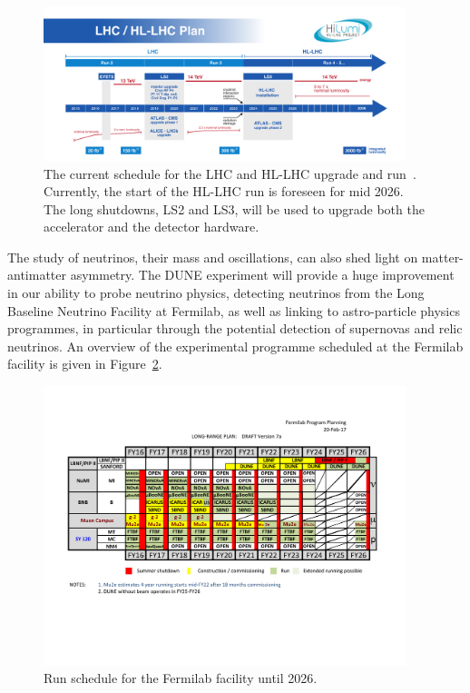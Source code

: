 \documentclass[twocolumn]{svjour3}          %
\begin{document}
\begin{figure}[bthp]
    \centering
    \includegraphics[width=0.94\textwidth]{HL-LHC-plan-2017-Plan-2.pdf}
    \caption{The current schedule for the LHC and HL-LHC upgrade
and run~\cite{HL-LHC}. Currently, the start of the HL-LHC run is foreseen for mid
2026. The long shutdowns, LS2 and LS3, will be used to upgrade both the
accelerator and the detector hardware.}
    \label{fig:hl-lhc}
\end{figure}

The study of neutrinos, their mass and oscillations, can also shed light
on matter-antimatter asymmetry. The DUNE experiment will provide a huge
improvement in our ability to probe neutrino physics, detecting
neutrinos from the Long Baseline Neutrino Facility at Fermilab, as well
as linking to astro-particle physics programmes, in particular through
the potential detection of supernovas and relic neutrinos. An overview
of the experimental programme scheduled at the Fermilab facility is
given in Figure~\ref{fig:fnal-if}.

\begin{figure}
\vspace*{0.3cm}
    \centering
    \includegraphics[width=0.94\textwidth]{10yr-PLAN-9Feb-2017-V7a.pdf}
    \caption{Run schedule for the Fermilab facility until 2026.}
    \label{fig:fnal-if}
\end{figure}
\end{document}
